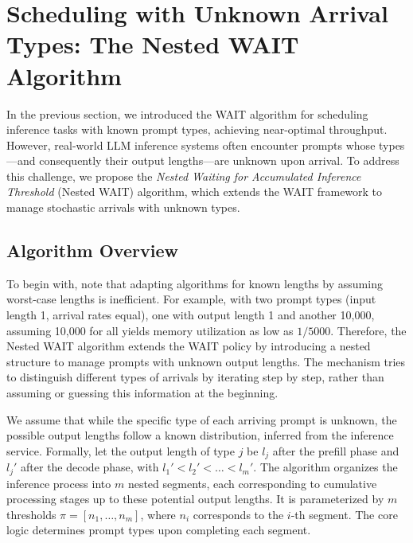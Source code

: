 \section{Scheduling with Unknown Arrival Types: The Nested WAIT Algorithm}
\label{sec:nested_wait}

In the previous section, we introduced the WAIT algorithm for scheduling inference tasks with known prompt types, achieving near-optimal throughput. However, real-world LLM inference systems often encounter prompts whose types—and consequently their output lengths—are unknown upon arrival. To address this challenge, we propose the \textit{Nested Waiting for Accumulated Inference Threshold} (Nested WAIT) algorithm, which extends the WAIT framework to manage stochastic arrivals with unknown types.

\subsection{Algorithm Overview}

To begin with, note that adapting algorithms for known lengths by assuming worst-case lengths is inefficient. For example, with two prompt types (input length 1, arrival rates equal), one with output length 1 and another 10,000, assuming 10,000 for all yields memory utilization as low as \( 1/5000 \). Therefore, the Nested WAIT algorithm extends the WAIT policy by introducing a nested structure to manage prompts with unknown output lengths. The mechanism tries to distinguish different types of arrivals by iterating step by step, rather than assuming or guessing this information at the beginning. 

We assume that while the specific type of each arriving prompt is unknown, the possible output lengths follow a known distribution, inferred from the inference service. Formally, let the output length of type \( j \) be \( l_j \) after the prefill phase and \( l_j' \) after the decode phase, with \( l_1' < l_2' < \dots < l_m' \). The algorithm organizes the inference process into \( m \) nested segments, each corresponding to cumulative processing stages up to these potential output lengths. It is parameterized by \( m \) thresholds \( \pi = [n_1, \dots, n_m] \), where \( n_i \) corresponds to the \( i \)-th segment. The core logic determines prompt types upon completing each segment.

